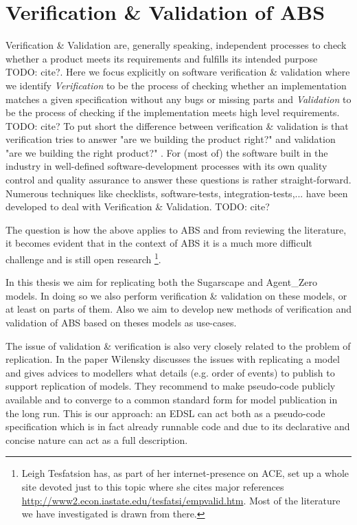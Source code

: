 \section{Verification \& Validation of ABS}
Verification \& Validation are, generally speaking, independent processes to check whether a product meets its requirements and fulfills its intended purpose TODO: cite?. Here we focus explicitly on software verification \& validation where we identify \textit{Verification} to be the process of checking whether an implementation matches a given specification without any bugs or missing parts and \textit{Validation} to be the process of checking if the implementation meets high level requirements. TODO: cite?
To put short the difference between verification \& validation is that verification tries to answer "are we building the product right?" and validation "are we building the right product?" \cite{boehm_software_1989}. For (most of) the software built in the industry in well-defined software-development processes with its own quality control and quality assurance to answer these questions is rather straight-forward. Numerous techniques like checklists, software-tests, integration-tests,... have been developed to deal with Verification \& Validation. TODO: cite?

The question is how the above applies to ABS and from reviewing the literature, it becomes evident that in the context of ABS it is a much more difficult challenge and is still open research \footnote{Leigh Tesfatsion has, as part of her internet-presence on ACE, set up a whole site devoted just to this topic where she cites major references \url{http://www2.econ.iastate.edu/tesfatsi/empvalid.htm}. Most of the literature we have investigated  is drawn from there.}. 

In this thesis we aim for replicating both the Sugarscape \cite{epstein_growing_1996} and Agent\_Zero \cite{epstein_agent_zero:_2014} models. In doing so we also perform verification \& validation on these models, or at least on parts of them. Also we aim to develop new methods of verification and validation of ABS based on theses models as use-cases. 

The issue of validation \& verification is also very closely related to the problem of replication. In the paper \cite{wilensky_making_2007} Wilensky discusses the issues with replicating a model and gives advices to modellers what details (e.g. order of events) to publish to support replication of models. They recommend to make pseudo-code publicly available and to converge to a common standard form for model publication in the long run. This is our approach: an EDSL can act both as a pseudo-code specification which is in fact already runnable code and due to its declarative and concise nature can act as a full description.
 











